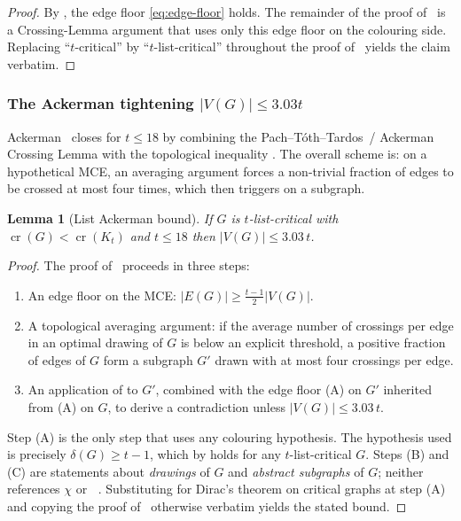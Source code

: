 \documentclass[11pt,a4paper]{article}
\newtheorem{lemma}[theorem]{Lemma}
\theoremstyle{definition}
\DeclareMathOperator{\crN}{cr}
\DeclareMathOperator{\chl}{\chi_{\ell}}
\begin{document}
\begin{proof}
By , the edge floor
\eqref{eq:edge-floor} holds. The remainder of the proof
of~\cite[Theorem~1.2]{BT} is a Crossing-Lemma argument that uses
only this edge floor on the colouring side. Replacing
``$t$-critical'' by ``$t$-list-critical'' throughout the proof
of~\cite[Theorem~1.2]{BT} yields the claim verbatim.
\end{proof}

\subsubsection*{The Ackerman tightening $|V(G)| \le 3.03t$}

Ackerman~\cite{Ackerman} closes  for
$t \le 18$ by combining the Pach--T\'oth--Tardos~/ Ackerman
Crossing Lemma with the topological inequality
. The overall scheme is: on a hypothetical
MCE, an averaging argument forces a non-trivial fraction of edges
to be crossed at most four times, which then triggers
 on a subgraph.

\begin{lemma}[List Ackerman bound]\label{lem:list-ackerman}
If $G$ is $t$-list-critical with $\crN(G) < \crN(K_t)$ and
$t \le 18$ then $|V(G)| \le 3.03\,t$.
\end{lemma}

\begin{proof}
The proof of~\cite[Theorem~1]{Ackerman} proceeds in three steps:

\begin{enumerate}
\item[(A)] An edge floor on the MCE:
$|E(G)| \ge \tfrac{t-1}{2}|V(G)|$.
\item[(B)] A topological averaging argument: if the average number
  of crossings per edge in an optimal drawing of $G$ is below an
  explicit threshold, a positive fraction of edges of $G$ form a
  subgraph $G'$ drawn with at most four crossings per edge.
\item[(C)] An application of  to $G'$,
  combined with the edge floor (A) on $G'$ inherited from (A) on
  $G$, to derive a contradiction unless $|V(G)| \le 3.03\,t$.
\end{enumerate}

Step (A) is the only step that uses any colouring hypothesis. The
hypothesis used is precisely $\delta(G) \ge t - 1$, which by
 holds for any $t$-list-critical $G$.
Steps (B) and (C) are statements about \emph{drawings} of $G$ and
\emph{abstract subgraphs} of $G$; neither references $\chi$ or
$\chl$. Substituting  for Dirac's theorem on
critical graphs at step (A) and copying the proof
of~\cite[Theorem~1]{Ackerman} otherwise verbatim yields the
stated bound.
\end{proof}
\end{document}
